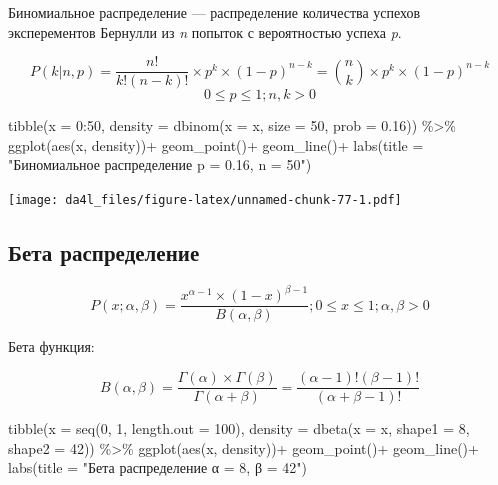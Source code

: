 \documentclass[
]{book}
\newenvironment{Shaded}{\begin{snugshade}}{\end{snugshade}}
\newcommand{\AttributeTok}[1]{\textcolor[rgb]{0.77,0.63,0.00}{#1}}
\newcommand{\DecValTok}[1]{\textcolor[rgb]{0.00,0.00,0.81}{#1}}
\newcommand{\FloatTok}[1]{\textcolor[rgb]{0.00,0.00,0.81}{#1}}
\newcommand{\FunctionTok}[1]{\textcolor[rgb]{0.00,0.00,0.00}{#1}}
\newcommand{\NormalTok}[1]{#1}
\newcommand{\SpecialCharTok}[1]{\textcolor[rgb]{0.00,0.00,0.00}{#1}}
\newcommand{\StringTok}[1]{\textcolor[rgb]{0.31,0.60,0.02}{#1}}
\begin{document}
Биномиальное распределение --- распределение количества успехов эксперементов Бернулли из \emph{n} попыток с вероятностью успеха \emph{p}.

\[P(k | n, p) = \frac{n!}{k!(n-k)!} \times p^k \times (1-p)^{n-k} =  {n \choose k} \times p^k \times (1-p)^{n-k}\]
\[ 0 \leq p \leq 1; n, k > 0\]

\begin{Shaded}
\begin{Highlighting}[]
\FunctionTok{tibble}\NormalTok{(}\AttributeTok{x =} \DecValTok{0}\SpecialCharTok{:}\DecValTok{50}\NormalTok{,}
           \AttributeTok{density =} \FunctionTok{dbinom}\NormalTok{(}\AttributeTok{x =}\NormalTok{ x, }\AttributeTok{size =} \DecValTok{50}\NormalTok{, }\AttributeTok{prob =} \FloatTok{0.16}\NormalTok{)) }\SpecialCharTok{\%\textgreater{}\%} 
  \FunctionTok{ggplot}\NormalTok{(}\FunctionTok{aes}\NormalTok{(x, density))}\SpecialCharTok{+}
  \FunctionTok{geom\_point}\NormalTok{()}\SpecialCharTok{+}
  \FunctionTok{geom\_line}\NormalTok{()}\SpecialCharTok{+}
  \FunctionTok{labs}\NormalTok{(}\AttributeTok{title =} \StringTok{"Биномиальное распределение p = 0.16, n = 50"}\NormalTok{)}
\end{Highlighting}
\end{Shaded}

\texttt{[image: da4l\_files/figure-latex/unnamed-chunk-77-1.pdf]}

\hypertarget{ux431ux435ux442ux430-ux440ux430ux441ux43fux440ux435ux434ux435ux43bux435ux43dux438ux435}{%
\subsection{Бета распределение}\label{ux431ux435ux442ux430-ux440ux430ux441ux43fux440ux435ux434ux435ux43bux435ux43dux438ux435}}

\[P(x; α, β) = \frac{x^{α-1}\times (1-x)^{β-1}}{B(α, β)}; 0 \leq x \leq 1; α, β > 0\]

Бета функция:

\[Β(α, β) = \frac{Γ(α)\times Γ(β)}{Γ(α+β)} = \frac{(α-1)!(β-1)!}{(α+β-1)!} \]

\begin{Shaded}
\begin{Highlighting}[]
\FunctionTok{tibble}\NormalTok{(}\AttributeTok{x =} \FunctionTok{seq}\NormalTok{(}\DecValTok{0}\NormalTok{, }\DecValTok{1}\NormalTok{, }\AttributeTok{length.out =} \DecValTok{100}\NormalTok{),}
           \AttributeTok{density =} \FunctionTok{dbeta}\NormalTok{(}\AttributeTok{x =}\NormalTok{ x, }\AttributeTok{shape1 =} \DecValTok{8}\NormalTok{, }\AttributeTok{shape2 =} \DecValTok{42}\NormalTok{)) }\SpecialCharTok{\%\textgreater{}\%} 
  \FunctionTok{ggplot}\NormalTok{(}\FunctionTok{aes}\NormalTok{(x, density))}\SpecialCharTok{+}
  \FunctionTok{geom\_point}\NormalTok{()}\SpecialCharTok{+}
  \FunctionTok{geom\_line}\NormalTok{()}\SpecialCharTok{+}
  \FunctionTok{labs}\NormalTok{(}\AttributeTok{title =} \StringTok{"Бета распределение α = 8, β = 42"}\NormalTok{)}
\end{Highlighting}
\end{Shaded}
\end{document}
